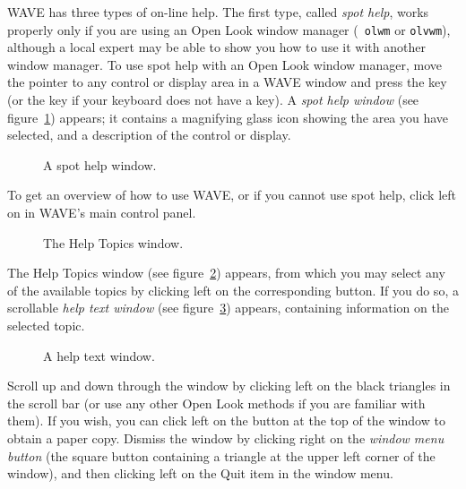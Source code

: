 \documentclass[twoside]{book}
\newcommand{\keycap}[1]{\cornersize{.5}\Ovalbox{\small\sf #1}}
\newcommand{\button}[1]{\cornersize{2}\ovalbox{\rule[-.3mm]{0cm}{2.5mm}\small\sf ~#1~}}
\newcommand{\WAVE}{{\sf WAVE}\xspace}
\begin{document}
\WAVE{} has three types of on-line help.  The first type, called \emph{spot
help}, works properly only if you are using an Open Look window manager ({\tt
olwm} or {\tt olvwm}), although a local expert may be able to show you how to
use it with another window manager.  To use spot help with an Open Look window
manager, move the pointer to any control or display area in a \WAVE{} window
and press the \keycap{HELP} key (or the \keycap{F1} key if your keyboard does
not have a \keycap{HELP} key).  A \emph{spot help window} (see
figure~\ref{fig:spot-help}) appears; it contains a magnifying glass icon
showing the area you have selected, and a description of the control or
display.
\begin{figure}
\begin{htmlonly}
\end{htmlonly}
\begin{latexonly}
\end{latexonly}
\label{fig:spot-help}
\centerline{}
\caption{A spot help window.}
\end{figure}

To get an overview of how to use \WAVE{}, or if you cannot use spot help,
click left on \button{Help} in \WAVE{}'s main control panel.
\begin{figure}
\centerline{}
\caption{The {\sf Help Topics} window.}
\begin{htmlonly}
\end{htmlonly}
\begin{latexonly}
\end{latexonly}
\label{fig:help-topics}
\end{figure}
The {\sf Help Topics} window (see figure~\ref{fig:help-topics})
appears, from which you may select any of the
available topics by clicking left on the corresponding button.  If you do so, a
scrollable \emph{help text window} (see figure~\ref{fig:help-text})
appears, containing information on the selected topic.
\begin{figure}
\centerline{}
\caption{A help text window.}
\begin{htmlonly}
\end{htmlonly}
\begin{latexonly}
\end{latexonly}
\label{fig:help-text}
\end{figure}
Scroll up and down through the window by clicking left on the black triangles
in the scroll bar (or use any other Open Look methods if you are familiar with
them).  If you wish, you can click left on the \button{Print} button at the top
of the window to obtain a paper copy.  Dismiss the window by clicking right on
the \emph{window menu button} (the square button containing a triangle at the
upper left corner of the window), and then clicking left on the {\sf Quit} item
in the window menu.
\end{document}

